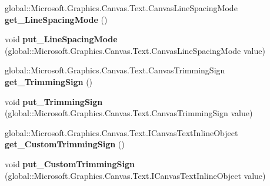 \begin{DoxyCompactItemize}
\item 
\mbox{\label{class_microsoft_1_1_graphics_1_1_canvas_1_1_text_1_1_canvas_text_layout_a80e906d0512252d17b70c935fcc440a5}} 
global\+::\+Microsoft.\+Graphics.\+Canvas.\+Text.\+Canvas\+Line\+Spacing\+Mode {\bfseries get\+\_\+\+Line\+Spacing\+Mode} ()
\item 
\mbox{\label{class_microsoft_1_1_graphics_1_1_canvas_1_1_text_1_1_canvas_text_layout_a99b5936e69b1769d738e3d0437fa745d}} 
void {\bfseries put\+\_\+\+Line\+Spacing\+Mode} (global\+::\+Microsoft.\+Graphics.\+Canvas.\+Text.\+Canvas\+Line\+Spacing\+Mode value)
\item 
\mbox{\label{class_microsoft_1_1_graphics_1_1_canvas_1_1_text_1_1_canvas_text_layout_a5c236351aff1b822b001c6d58d99a4ef}} 
global\+::\+Microsoft.\+Graphics.\+Canvas.\+Text.\+Canvas\+Trimming\+Sign {\bfseries get\+\_\+\+Trimming\+Sign} ()
\item 
\mbox{\label{class_microsoft_1_1_graphics_1_1_canvas_1_1_text_1_1_canvas_text_layout_a6038b04e1633c19a344323c3adb9048c}} 
void {\bfseries put\+\_\+\+Trimming\+Sign} (global\+::\+Microsoft.\+Graphics.\+Canvas.\+Text.\+Canvas\+Trimming\+Sign value)
\item 
\mbox{\label{class_microsoft_1_1_graphics_1_1_canvas_1_1_text_1_1_canvas_text_layout_a5dc8d39fbd74051d1f66f159c55ef5f3}} 
global\+::\+Microsoft.\+Graphics.\+Canvas.\+Text.\+I\+Canvas\+Text\+Inline\+Object {\bfseries get\+\_\+\+Custom\+Trimming\+Sign} ()
\item 
\mbox{\label{class_microsoft_1_1_graphics_1_1_canvas_1_1_text_1_1_canvas_text_layout_a31d76ac5905938caf13ffb5911f8303a}} 
void {\bfseries put\+\_\+\+Custom\+Trimming\+Sign} (global\+::\+Microsoft.\+Graphics.\+Canvas.\+Text.\+I\+Canvas\+Text\+Inline\+Object value)
\item 
\mbox{\label{class_microsoft_1_1_graphics_1_1_canvas_1_1_text_1_1_canvas_text_layout_adebf612a8df4663884f5d4a38f41ea39}} 

\end{DoxyCompactItemize}
